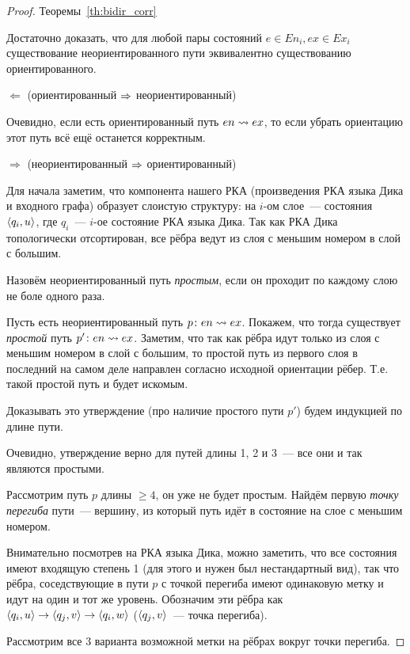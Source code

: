 \begin{proof}{Теоремы~\ref{th:bidir_corr}}

  Достаточно доказать, что для любой пары состояний $e \in En_i, ex \in Ex_i$ существование неориентированного пути эквивалентно существованию ориентированного.

  $\Leftarrow$ (ориентированный $\Rightarrow$ неориентированный)

  Очевидно, если есть ориентированный путь $en \rightsquigarrow ex$, то если убрать ориентацию этот путь всё ещё останется корректным.

  $\Rightarrow$ (неориентированный $\Rightarrow$ ориентированный)

  Для начала заметим, что компонента нашего РКА (произведения РКА языка Дика и входного графа) образует слоистую структуру: на $i$-ом слое~--- состояния $\langle q_i, u \rangle$, где $q_i$~--- $i$-ое состояние РКА языка Дика. Так как РКА Дика топологически отсортирован, все рёбра ведут из слоя с меньшим номером в слой с большим.

  Назовём неориентированный путь \textit{простым}, если он проходит по каждому слою не боле одного раза.

  Пусть есть неориентированный путь $p \colon en \rightsquigarrow ex$. Покажем, что тогда существует \textit{простой} путь $p' \colon en \rightsquigarrow ex$. Заметим, что так как рёбра идут только из слоя с меньшим номером в слой с большим, то простой путь из первого слоя в последний на самом деле направлен согласно исходной ориентации рёбер. Т.е. такой простой путь и будет искомым.

  Доказывать это утверждение (про наличие простого пути $p'$) будем индукцией по длине пути.

  Очевидно, утверждение верно для путей длины 1, 2 и 3~--- все они и так являются простыми.

  Рассмотрим путь $p$ длины $\ge 4$, он уже не будет простым. Найдём первую \textit{точку перегиба} пути~--- вершину, из который путь идёт в состояние на слое с меньшим номером.

  Внимательно посмотрев на РКА языка Дика, можно заметить, что все состояния имеют входящую степень 1 (для этого и нужен был нестандартный вид), так что рёбра, соседствующие в пути $p$ с точкой перегиба имеют одинаковую метку и идут на один и тот же уровень. Обозначим эти рёбра как $\langle q_i, u \rangle \rightarrow \langle q_j, v \rangle \rightarrow \langle q_i, w \rangle$ ($\langle q_j, v \rangle$~--- точка перегиба).

  Рассмотрим все 3 варианта возможной метки на рёбрах вокруг точки перегиба.


\end{proof}
